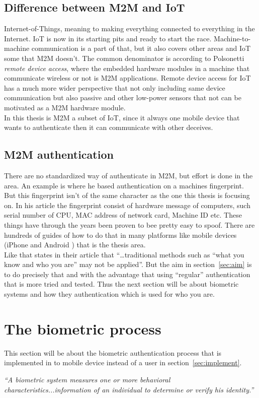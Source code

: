 \subsection{Difference between M2M and IoT}
Internet-of-Things, meaning to making everything connected to everything in the Internet. IoT is now in its starting pits and ready to start the race. Machine-to-machine communication is a part of that, but it also covers other areas and IoT some that M2M doesn't. The common denominator is according to Polsonetti \textit{remote device access}, where the embedded hardware modules in a machine that communicate wireless or not is M2M applications. Remote device access for IoT has a much more wider perspective that not only including same device communication but also passive and other low-power sensors that not can be motivated as a M2M hardware module.
\cite[]{cpM2MIoT}\\
In this thesis is M2M a subset of IoT, since it always one mobile device that wants to authenticate then it can communicate with other deceives.

\subsection{M2M authentication}
There are no standardized way of authenticate in M2M, but effort is done in the area. An example is \cite[]{auth:M2M} where he based authentication on a machines fingerprint. But this fingerprint isn't of the same character as the one this thesis is focusing on. In his article the fingerprint consist of hardware message of computers, such serial number of CPU, MAC address of network card, Machine ID etc. These things have through the years been proven to bee pretty easy to spoof. There are hundreds of guides of how to do that in many platforms like mobile devices (iPhone \cite[]{spoofMaciPhone} and Android \cite[]{spoofMacAndriod}) that is the thesis area. \\
Like \cite[]{auth:M2Mcom} that states in their article that ``\dots traditional methods such as “what you know and who you are” may not be applied''. But the aim in section~\ref{sec:aim} is to do precisely that and with the advantage that using ``regular'' authentication that is more  tried and tested. Thus the next section will be about biometric systems and how they authentication which is used for who you are.

\section{The biometric process}\label{sec:biometric}
This section will be about the biometric authentication process that is implemented in to mobile device instead of a user in section~\ref{sec:implement}. \\
\begin{center}\textit{``A biometric system measures one or more behavioral characteristics...information of an individual to determine or verify his identity.''} \cite[p.~3]{introbio}\end{center}


